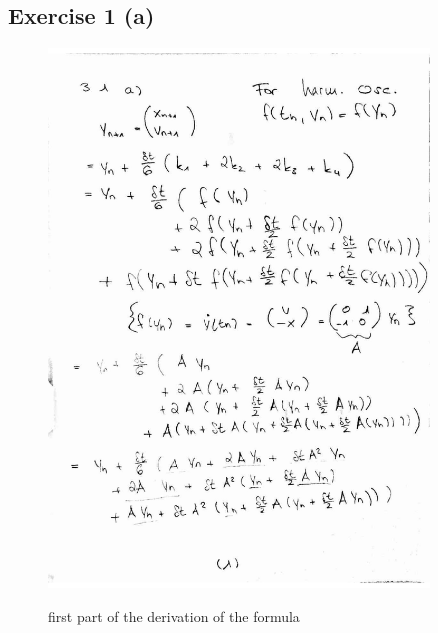 \documentclass[12pt,a4paper]{article}	%
\begin{document}
\subsection{Exercise 1 (a)}

\begin{figure}[h!]		
\centering
{\includegraphics[width=0.9\textwidth]{3_1_a1.jpg}}		
\caption{first part of the derivation of the formula}
\end{figure}

\newpage
\end{document}
